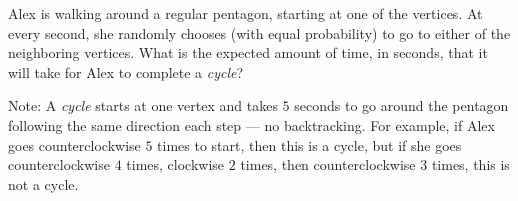 Alex is walking around a regular pentagon, starting at one of the vertices. At every second, she randomly chooses (with equal probability) to go to either of the neighboring vertices. What is the expected amount of time, in seconds, that it will take for Alex to complete a \emph{cycle}?
	
	Note: A \emph{cycle} starts at one vertex and takes $5$ seconds to go around the pentagon following the same direction each step --- no backtracking. For example, if Alex goes counterclockwise $5$ times to start, then this is a cycle, but if she goes counterclockwise $4$ times, clockwise $2$ times, then counterclockwise $3$ times, this is not a cycle.